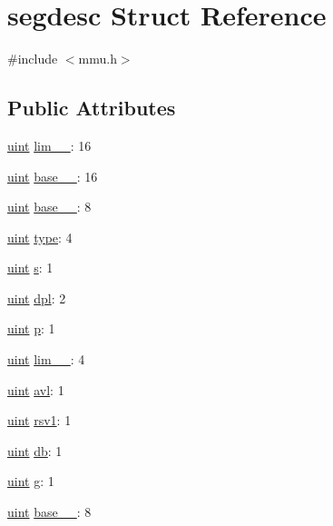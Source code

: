 \hypertarget{structsegdesc}{}\section{segdesc Struct Reference}
\label{structsegdesc}


{\ttfamily \#include $<$mmu.\+h$>$}

\subsection*{Public Attributes}
\begin{DoxyCompactItemize}
\item 
\hyperlink{custom__types_8h_a91ad9478d81a7aaf2593e8d9c3d06a14}{uint} \hyperlink{structsegdesc_a021002a4cf151893b5b8034b09cc7530}{lim\+\_\+\_}\+: 16
\item 
\hyperlink{custom__types_8h_a91ad9478d81a7aaf2593e8d9c3d06a14}{uint} \hyperlink{structsegdesc_aaf95dd5b9105cf5729de49eb2542072a}{base\+\_\+\_}\+: 16
\item 
\hyperlink{custom__types_8h_a91ad9478d81a7aaf2593e8d9c3d06a14}{uint} \hyperlink{structsegdesc_aa5cff1f1ddfac386e2268108c8f5b6c2}{base\+\_\+\_}\+: 8
\item 
\hyperlink{custom__types_8h_a91ad9478d81a7aaf2593e8d9c3d06a14}{uint} \hyperlink{structsegdesc_acb54ea5ee6d09cfcc8b4dd3e96e4ce5b}{type}\+: 4
\item 
\hyperlink{custom__types_8h_a91ad9478d81a7aaf2593e8d9c3d06a14}{uint} \hyperlink{structsegdesc_aacc67bb0857f0c77c1f8a5c9b8a1ac09}{s}\+: 1
\item 
\hyperlink{custom__types_8h_a91ad9478d81a7aaf2593e8d9c3d06a14}{uint} \hyperlink{structsegdesc_ab22349cefd6990e4a9a1d93e42ee0c03}{dpl}\+: 2
\item 
\hyperlink{custom__types_8h_a91ad9478d81a7aaf2593e8d9c3d06a14}{uint} \hyperlink{structsegdesc_a322a34a84a3815d35ebb3aa50c5a55e2}{p}\+: 1
\item 
\hyperlink{custom__types_8h_a91ad9478d81a7aaf2593e8d9c3d06a14}{uint} \hyperlink{structsegdesc_abbc27a39a2ad6e59faa2eca33d7dfa0c}{lim\+\_\+\_}\+: 4
\item 
\hyperlink{custom__types_8h_a91ad9478d81a7aaf2593e8d9c3d06a14}{uint} \hyperlink{structsegdesc_a6623d25de54a0a87d7a43ea4dfe7783f}{avl}\+: 1
\item 
\hyperlink{custom__types_8h_a91ad9478d81a7aaf2593e8d9c3d06a14}{uint} \hyperlink{structsegdesc_a5798904f15e8fb63d2dd37e8a2818f0a}{rsv1}\+: 1
\item 
\hyperlink{custom__types_8h_a91ad9478d81a7aaf2593e8d9c3d06a14}{uint} \hyperlink{structsegdesc_a08edbd480d21bfd147e304b6f5a3788f}{db}\+: 1
\item 
\hyperlink{custom__types_8h_a91ad9478d81a7aaf2593e8d9c3d06a14}{uint} \hyperlink{structsegdesc_a6af7593606fa1a1ff003b4a78facc8e0}{g}\+: 1
\item 
\hyperlink{custom__types_8h_a91ad9478d81a7aaf2593e8d9c3d06a14}{uint} \hyperlink{structsegdesc_a164a6a2e75fc62e61daef3ddab7f3169}{base\+\_\+\_}\+: 8
\end{DoxyCompactItemize}


